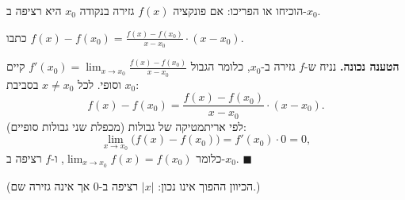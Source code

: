
\begin{question}
הוכיחו או הפריכו: אם פונקציה $f(x)$ גזירה בנקודה $x_0$ היא רציפה ב-$x_0$.
\end{question}

\begin{hint}
כתבו $f(x)-f(x_0)=\frac{f(x)-f(x_0)}{x-x_0}\cdot(x-x_0)$.
\end{hint}

\begin{solution}
\textbf{הטענה נכונה.} נניח ש-$f$ גזירה ב-$x_0$, כלומר הגבול $f'(x_0)=\lim_{x\to x_0}\frac{f(x)-f(x_0)}{x-x_0}$ קיים וסופי. לכל $x\ne x_0$ בסביבת $x_0$:
\[ f(x)-f(x_0)=\frac{f(x)-f(x_0)}{x-x_0}\cdot(x-x_0). \]
לפי אריתמטיקה של גבולות (מכפלת שני גבולות סופיים):
\[ \lim_{x\to x_0}\big(f(x)-f(x_0)\big)=f'(x_0)\cdot0=0, \]
כלומר $\lim_{x\to x_0}f(x)=f(x_0)$, ו-$f$ רציפה ב-$x_0$. $\blacksquare$

(הכיוון ההפוך אינו נכון: $|x|$ רציפה ב-$0$ אך אינה גזירה שם.)
\end{solution}
